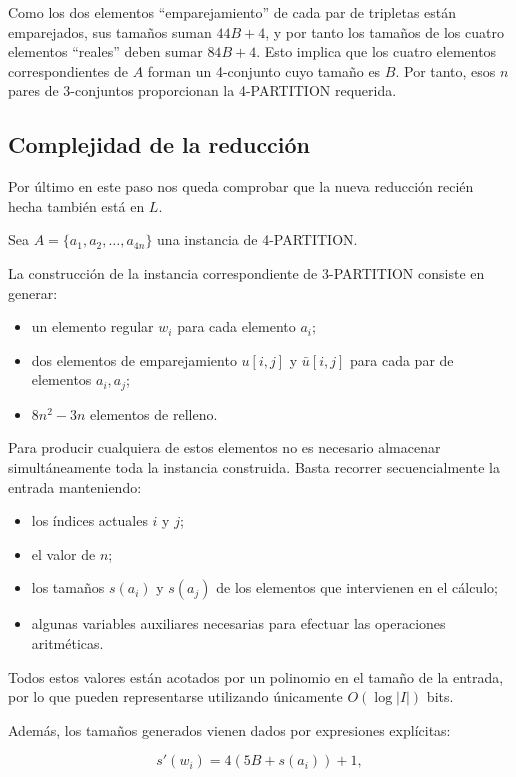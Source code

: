 \documentclass{article}
\begin{document}
Como los dos elementos ``emparejamiento'' de cada par de tripletas están emparejados, sus tamaños suman $44B+4$, y por tanto los tamaños de los cuatro elementos ``reales'' deben sumar $84B+4$. Esto implica que los cuatro elementos correspondientes de $A$ forman un 4-conjunto cuyo tamaño es $B$. Por tanto, esos $n$ pares de 3-conjuntos proporcionan la 4-PARTITION requerida.

\subsection*{Complejidad de la reducción}
Por último en este paso nos queda comprobar que la nueva reducción recién hecha también está en $L$.

\vspace{1\baselineskip}
Sea $A=\{a_1,a_2,\ldots,a_{4n}\}$ una instancia de 4-PARTITION.

La construcción de la instancia correspondiente de 3-PARTITION consiste en generar:

\begin{itemize}
\item un elemento regular $w_i$ para cada elemento $a_i$;
\item dos elementos de emparejamiento $u[i,j]$ y $\bar{u}[i,j]$ para cada par de elementos $a_i,a_j$;
\item $8n^2-3n$ elementos de relleno.
\end{itemize}

Para producir cualquiera de estos elementos no es necesario almacenar simultáneamente toda la instancia construida. Basta recorrer secuencialmente la entrada manteniendo:

\begin{itemize}
\item los índices actuales $i$ y $j$;
\item el valor de $n$;
\item los tamaños $s(a_i)$ y $s(a_j)$ de los elementos que intervienen en el cálculo;
\item algunas variables auxiliares necesarias para efectuar las operaciones aritméticas.
\end{itemize}

Todos estos valores están acotados por un polinomio en el tamaño de la entrada, por lo que pueden representarse utilizando únicamente
$O(\log |I|)$
bits.

Además, los tamaños generados vienen dados por expresiones explícitas:

\[
s'(w_i)=4(5B+s(a_i))+1,
\]
\end{document}
